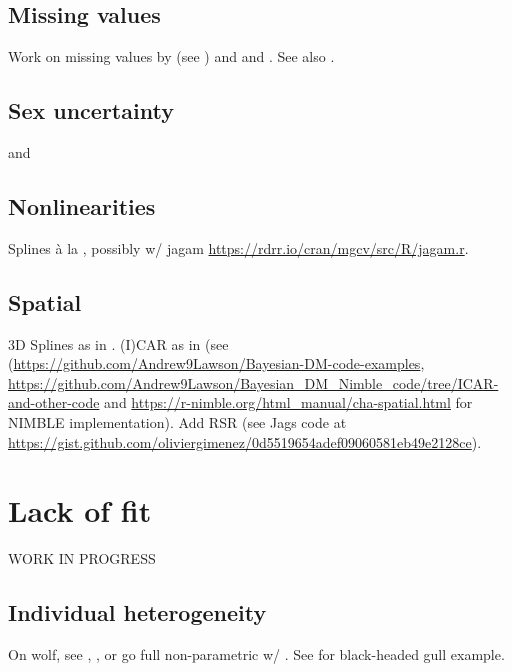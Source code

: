 \documentclass[
  12pt,
]{krantz}
\begin{document}
\section{Missing values}\label{naincov}

Work on missing values by \citet{bonner2006} (see \citet{gimenez2009winbugs}) and \citet{langrock2013maximum} and \citet{worthington2015}. See also \citet{rose2018}.

\section{Sex uncertainty}\label{sex-uncertainty}

\citet{pradel2008sex} and \citet{genovart_exploiting_2012}

\section{Nonlinearities}\label{nonlinearities}

Splines à la \citet{gimenez_semiparametric_2006}, possibly w/ jagam \url{https://rdrr.io/cran/mgcv/src/R/jagam.r}.

\section{Spatial}\label{spatial}

3D Splines as in \citet{Peron2011}. (I)CAR as in \citet{saracco2010icar} (see (\url{https://github.com/Andrew9Lawson/Bayesian-DM-code-examples}, \url{https://github.com/Andrew9Lawson/Bayesian_DM_Nimble_code/tree/ICAR-and-other-code} and \url{https://r-nimble.org/html_manual/cha-spatial.html} for NIMBLE implementation). Add RSR \citet{khan2022rsr} (see Jags code at \url{https://gist.github.com/oliviergimenez/0d5519654adef09060581eb49e2128ce}).

\chapter{Lack of fit}\label{lackoffit}

WORK IN PROGRESS

\section{Individual heterogeneity}\label{individual-heterogeneity}

On wolf, see \citet{cubaynes_importance_2010}, \citet{gimenez_individual_2010}, or go full non-parametric w/ \citet{turek_bayesian_2021}. See \citet{pradel2009} for black-headed gull example.
\end{document}
